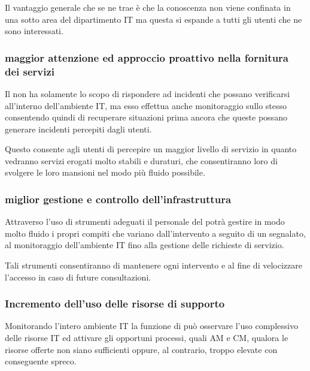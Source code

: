 Il vantaggio generale che se ne trae è che la conoscenza non viene confinata in una sotto area del dipartimento \acs{IT} ma questa si espande a tutti gli utenti che ne sono interessati.

\subsubsection[Maggior attenzione ed approccio proattivo nella fonrnitura dei servizi]{maggior attenzione ed approccio proattivo nella fornitura dei servizi}
Il  non ha solamente lo scopo di rispondere ad incidenti che possano verificarsi all'interno dell'ambiente \acs{IT}, ma esso effettua anche monitoraggio sullo stesso consentendo quindi di recuperare situazioni prima ancora che queste possano generare incidenti percepiti dagli utenti.

Questo consente agli utenti di percepire un maggior livello di servizio in quanto vedranno servizi erogati molto stabili e duraturi, che consentiranno loro di svolgere le loro mansioni nel modo più fluido possibile.

\subsubsection[Miglior gestione e controllo dell'infrastruttura]{miglior gestione e controllo dell'infrastruttura}
Attraverso l'uso di strumenti adeguati il personale del  potrà gestire in modo molto fluido i propri compiti che variano dall'intervento a seguito di un  segnalato, al monitoraggio dell'ambiente \acs{IT} fino alla gestione delle richieste di servizio.

Tali strumenti consentiranno di mantenere ogni intervento  e  al fine di velocizzare l'accesso in caso di future consultazioni.

\subsubsection[Incremento dell'uso delle risorse di supporto]{Incremento dell'uso delle risorse di supporto}
Monitorando l'intero ambiente \acs{IT} la funzione di  può osservare l'uso complessivo delle risorse \acs{IT} ed attivare gli opportuni processi, quali \ac{AM} e \ac{CM}, qualora le risorse offerte non siano sufficienti oppure, al contrario, troppo elevate con conseguente spreco.

